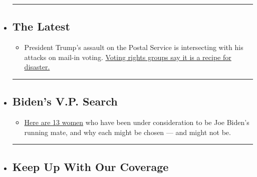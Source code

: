 \begin{itemize}
\item
  \begin{center}\rule{0.5\linewidth}{\linethickness}\end{center}

  \hypertarget{the-latest}{%
  \subsection{The Latest}\label{the-latest}}

  \begin{itemize}
  \tightlist
  \item
    President Trump's assault on the Postal Service is intersecting with
    his attacks on mail-in voting.
    \href{https://www.nytimes.com/2020/07/31/us/politics/trump-usps-mail-delays.html?action=click\&pgtype=Article\&state=default\&region=BELOW_MAIN_CONTENT\&context=storylines_guide}{Voting
    rights groups say it is a recipe for disaster.}
  \end{itemize}
\item
  \begin{center}\rule{0.5\linewidth}{\linethickness}\end{center}

  \hypertarget{bidens-vp-search}{%
  \subsection{Biden's V.P. Search}\label{bidens-vp-search}}

  \begin{itemize}
  \tightlist
  \item
    \href{https://www.nytimes.com/article/biden-vice-president-2020.html?action=click\&pgtype=Article\&state=default\&region=BELOW_MAIN_CONTENT\&context=storylines_guide}{Here
    are 13 women} who have been under consideration to be Joe Biden's
    running mate, and why each might be chosen --- and might not be.
  \end{itemize}
\item
  \begin{center}\rule{0.5\linewidth}{\linethickness}\end{center}

  \hypertarget{keep-up-with-our-coverage}{%
  \subsection{Keep Up With Our
  Coverage}\label{keep-up-with-our-coverage}}


\end{itemize}

